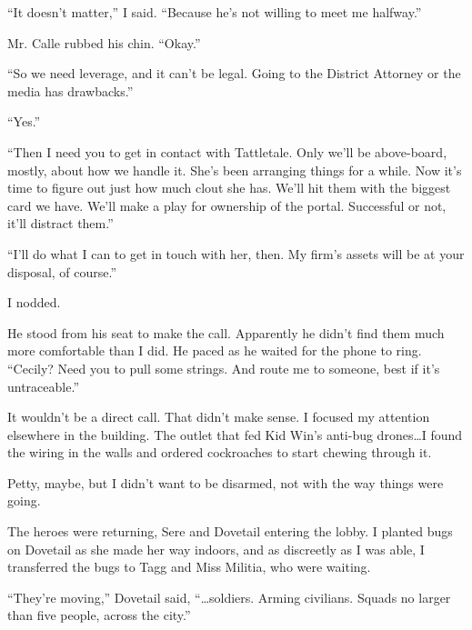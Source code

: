 ``It doesn't matter,'' I said.  ``Because he's not willing to meet me halfway.''



Mr. Calle rubbed his chin.  ``Okay.''



``So we need leverage, and it can't be legal.  Going to the District Attorney or the media has drawbacks.''



``Yes.''



``Then I need you to get in contact with Tattletale.  Only we'll be above-board, mostly, about how we handle it.  She's been arranging things for a while.  Now it's time to figure out just how much clout she has.  We'll hit them with the biggest card we have.  We'll make a play for ownership of the portal.  Successful or not, it'll distract them.''



``I'll do what I can to get in touch with her, then.  My firm's assets will be at your disposal, of course.''



I nodded.



He stood from his seat to make the call.  Apparently he didn't find them much more comfortable than I did.  He paced as he waited for the phone to ring.  ``Cecily?  Need you to pull some strings.  And route me to someone, best if it's untraceable.''



It wouldn't be a direct call.  That didn't make sense.  I focused my attention elsewhere in the building.  The outlet that fed Kid Win's anti-bug drones\ldots I found the wiring in the walls and ordered cockroaches to start chewing through it.



Petty, maybe, but I didn't want to be disarmed, not with the way things were going.



The heroes were returning, Sere and Dovetail entering the lobby.  I planted bugs on Dovetail as she made her way indoors, and as discreetly as I was able, I transferred the bugs to Tagg and Miss Militia, who were waiting.



``They're moving,'' Dovetail said, ``\ldots soldiers.  Arming civilians.  Squads no larger than five people, across the city.''




